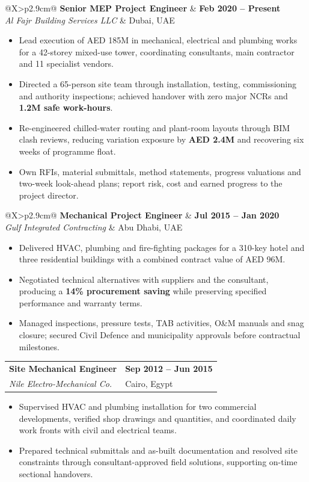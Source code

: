 \documentclass[10pt,a4paper]{article}
\makeatletter
\newcommand{\job}[4]{%
  \begin{tabularx}{\linewidth}{@{}X>{\raggedleft\arraybackslash}p{2.9cm}@{}}
    {\bfseries\color{navy}\fontsize{10.4}{12}\selectfont #1} &
    {\bfseries\color{teal}\fontsize{8.6}{10}\selectfont #2} \\
    {\itshape\color{muted}\fontsize{9}{10.5}\selectfont #3} &
    {\color{muted}\fontsize{8.4}{10}\selectfont #4}
  \end{tabularx}\vspace{-1pt}%
}
\makeatother
\begin{document}
\begin{minipage}[t]{12.15cm}
  \job{Senior MEP Project Engineer}{Feb 2020 -- Present}
      {Al Fajr Building Services LLC}{Dubai, UAE}
  \begin{itemize}
    \item Lead execution of AED 185M in mechanical, electrical and plumbing works for a
      42-storey mixed-use tower, coordinating consultants, main contractor and 11 specialist vendors.
    \item Directed a 65-person site team through installation, testing, commissioning and
      authority inspections; achieved handover with zero major NCRs and \textbf{1.2M safe work-hours}.
    \item Re-engineered chilled-water routing and plant-room layouts through BIM clash reviews,
      reducing variation exposure by \textbf{AED 2.4M} and recovering six weeks of programme float.
    \item Own RFIs, material submittals, method statements, progress valuations and two-week
      look-ahead plans; report risk, cost and earned progress to the project director.
  \end{itemize}

  \vspace{2pt}
  \job{Mechanical Project Engineer}{Jul 2015 -- Jan 2020}
      {Gulf Integrated Contracting}{Abu Dhabi, UAE}
  \begin{itemize}
    \item Delivered HVAC, plumbing and fire-fighting packages for a 310-key hotel and three
      residential buildings with a combined contract value of AED 96M.
    \item Negotiated technical alternatives with suppliers and the consultant, producing a
      \textbf{14\% procurement saving} while preserving specified performance and warranty terms.
    \item Managed inspections, pressure tests, TAB activities, O\&M manuals and snag closure;
      secured Civil Defence and municipality approvals before contractual milestones.
  \end{itemize}

  \vspace{2pt}
  \job{Site Mechanical Engineer}{Sep 2012 -- Jun 2015}
      {Nile Electro-Mechanical Co.}{Cairo, Egypt}
  \begin{itemize}
    \item Supervised HVAC and plumbing installation for two commercial developments, verified
      shop drawings and quantities, and coordinated daily work fronts with civil and electrical teams.
    \item Prepared technical submittals and as-built documentation and resolved site constraints
      through consultant-approved field solutions, supporting on-time sectional handovers.
  \end{itemize}


\end{minipage}
\end{document}
